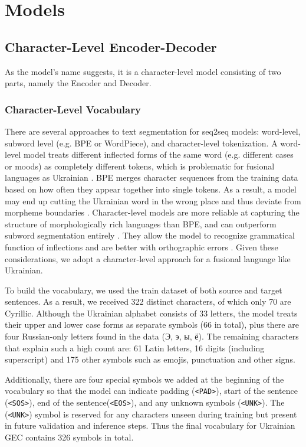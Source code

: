 \documentclass[11pt]{article}
\begin{document}
\section{Models}

\subsection{Character-Level Encoder-Decoder}
 As the model's name suggests, it is a character-level model consisting of two parts, namely the Encoder and Decoder. 

\subsubsection{Character-Level Vocabulary}
There are several approaches to text segmentation for seq2seq models: word-level, subword level (e.g. BPE or WordPiece), and character-level tokenization. A word-level model treats different inflected forms of the same word (e.g. different cases or moods) as completely different tokens, which is problematic for fusional languages as Ukrainian \citep{syvokon-etal-2023-ua}. BPE merges character sequences from the training data based on how often they appear together into single tokens. As a result, a model may end up cutting the Ukrainian word in the wrong place and thus deviate from morpheme boundaries \citep{bostrom-durrett-2020-byte}.
Character-level models are more reliable at capturing the structure of morphologically rich languages than BPE, and can outperform subword segmentation entirely \cite{shapiro-duh-2018-bpe}. They allow the model to recognize grammatical function of inflections and are better with orthographic errors \citep{xie-etal-2016-neural}. Given these considerations, we adopt a character-level approach for a fusional language like Ukrainian.


To build the vocabulary, we used the train dataset of both source and target sentences. As a result, we received 322 distinct characters, of which only 70 are Cyrillic. Although the Ukrainian alphabet consists of 33 letters, the model treats their upper and lower case forms as separate symbols (66 in total), plus there are four Russian-only letters found in the data (\foreignlanguage{ukrainian}{Э, э, ы, ё}). The remaining characters that explain  such a high count are: 61  Latin letters, 16 digits (including superscript) and 175 other symbols such as emojis, punctuation and other signs. 

Additionally, there are four special symbols we added at the beginning of the vocabulary so that the model can indicate padding (\texttt{<PAD>}), start of the sentence (\texttt{<SOS>}), end of the sentence(\texttt{<EOS>}), and any unknown symbols (\texttt{<UNK>}). The (\texttt{<UNK>}) symbol is reserved for any characters unseen during training but present in future validation and inference steps. Thus the final vocabulary for Ukrainian GEC contains 326 symbols in total.
\end{document}

